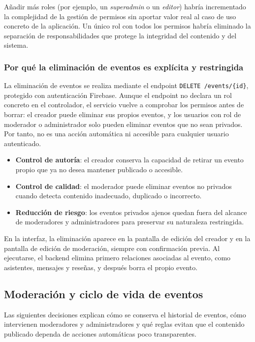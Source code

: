 Añadir más roles (por ejemplo, un \textit{superadmin} o un \textit{editor}) habría incrementado la complejidad de la gestión de permisos sin aportar valor real al caso de uso concreto de la aplicación. Un único rol con todos los permisos habría eliminado la separación de responsabilidades que protege la integridad del contenido y del sistema.

\subsubsection{Por qué la eliminación de eventos es explícita y restringida}

La eliminación de eventos se realiza mediante el endpoint \texttt{DELETE /events/\{id\}}, protegido con autenticación Firebase. Aunque el endpoint no declara un rol concreto en el controlador, el servicio vuelve a comprobar los permisos antes de borrar: el creador puede eliminar sus propios eventos, y los usuarios con rol de moderador o administrador solo pueden eliminar eventos que no sean privados. Por tanto, no es una acción automática ni accesible para cualquier usuario autenticado.

\begin{itemize}
    \item \textbf{Control de autoría}: el creador conserva la capacidad de retirar un evento propio que ya no desea mantener publicado o accesible.
    \item \textbf{Control de calidad}: el moderador puede eliminar eventos no privados cuando detecta contenido inadecuado, duplicado o incorrecto.
    \item \textbf{Reducción de riesgo}: los eventos privados ajenos quedan fuera del alcance de moderadores y administradores para preservar su naturaleza restringida.
\end{itemize}

En la interfaz, la eliminación aparece en la pantalla de edición del creador y en la pantalla de edición de moderación, siempre con confirmación previa. Al ejecutarse, el backend elimina primero relaciones asociadas al evento, como asistentes, mensajes y reseñas, y después borra el propio evento.

\subsection{Moderación y ciclo de vida de eventos}

Las siguientes decisiones explican cómo se conserva el historial de eventos, cómo intervienen moderadores y administradores y qué reglas evitan que el contenido publicado dependa de acciones automáticas poco transparentes.

